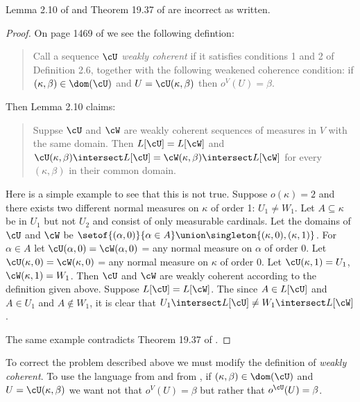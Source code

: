 \documentclass[oneside,12pt]{amsart}
\begin{document}
\begin{note}
Lemma 2.10 of \cite{BeginningInnerModelTheory} and Theorem 19.37 of \cite{Jech_Book2}
are incorrect as written.
\end{note}
\begin{proof}
On page 1469 of \cite{BeginningInnerModelTheory} we see the following defintion:

\begin{quote}
Call a sequence $\cU$ \emph{weakly coherent} if it satisfies conditions 1 and 2 of Definition 2.6, together with the following weakened coherence condition: if $(\kappa,\beta) \in \dom(\cU)$ and
$U = \cU(\kappa, \beta)$ then $o^{V}(U)=\beta$.
\end{quote}

Then Lemma 2.10 claims:

\begin{quote}
Suppse $\cU$ and $\cW$ are weakly coherent sequences of measures in $V$ with the same
domain. Then $L[\cU] = L[\cW]$ and $\cU(\kappa, \beta) \intersect L[\cU] =
\cW(\kappa, \beta) \intersect L[\cW]$ for every $(\kappa, \beta)$ in their common
domain.
\end{quote}

Here is a simple example to see that this is not true. Suppose $o(\kappa) = 2$
and there exists two different normal measures on $\kappa$ of order 1:
$U_{1} \not= W_{1}$. Let $A\subseteq \kappa$ be in $U_{1}$ but not $U_{2}$ and consist
of only measurable cardinals.
Let the domains of $\cU$ and $\cW$ be $\setof{(\alpha,0)}{\alpha\in A} \union
\singleton{(\kappa,0), (\kappa, 1)}$.
For $\alpha\in A$ let $\cU(\alpha,0) = \cW(\alpha, 0)$ = any normal measure on
$\alpha$ of order 0. Let $\cU(\kappa,0) = \cW(\kappa, 0)$  = any normal measure
on $\kappa$ of order 0. Let $\cU(\kappa,1) = U_{1}$,
$\cW(\kappa,1) = W_{1}$. Then $\cU$ and $\cW$ are weakly coherent according to
the definition given above. Suppose $L[\cU] = L[\cW]$. The since $A\in L[\cU]$
and $A\in U_1$ and $A \notin W_1$, it is clear that
$U_1 \intersect L[\cU] \not= W_1 \intersect L[\cW]$.

The same example contradicts Theorem 19.37 of \cite{Jech_Book2}.
\end{proof}

To correct the problem described above we must modify the definition of \emph{weakly coherent}.
To use the language from \cite{Jech_Book2} and from \cite{Mitchell-Revisited},
if $(\kappa,\beta) \in \dom(\cU)$  and $U = \cU(\kappa, \beta)$ we want not that
$o^{V}(U)=\beta$ but rather that $o^{\cU}(U)=\beta$.
\end{document}
